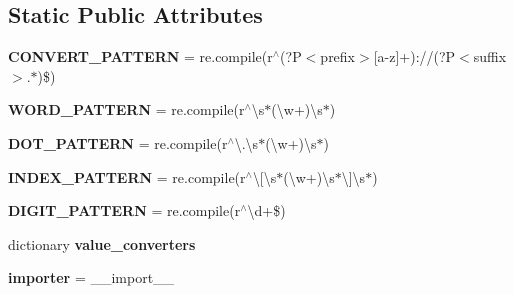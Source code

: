 \subsection*{Static Public Attributes}
\begin{DoxyCompactItemize}
\item 
\mbox{\label{classpip_1_1compat_1_1dictconfig_1_1_base_configurator_a16d71888a0a0416fc67f87da404765a2}} 
{\bfseries C\+O\+N\+V\+E\+R\+T\+\_\+\+P\+A\+T\+T\+E\+RN} = re.\+compile(r\textquotesingle{}$^\wedge$(?P$<$prefix$>$\mbox{[}a-\/z\mbox{]}+)\+://(?P$<$suffix$>$.$\ast$)\$\textquotesingle{})
\item 
\mbox{\label{classpip_1_1compat_1_1dictconfig_1_1_base_configurator_a732ec2589655e26816b061e16e42a866}} 
{\bfseries W\+O\+R\+D\+\_\+\+P\+A\+T\+T\+E\+RN} = re.\+compile(r\textquotesingle{}$^\wedge$\textbackslash{}s$\ast$(\textbackslash{}w+)\textbackslash{}s$\ast$\textquotesingle{})
\item 
\mbox{\label{classpip_1_1compat_1_1dictconfig_1_1_base_configurator_a87c98c71a2e6f32b9d1253503c13fdac}} 
{\bfseries D\+O\+T\+\_\+\+P\+A\+T\+T\+E\+RN} = re.\+compile(r\textquotesingle{}$^\wedge$\textbackslash{}.\textbackslash{}s$\ast$(\textbackslash{}w+)\textbackslash{}s$\ast$\textquotesingle{})
\item 
\mbox{\label{classpip_1_1compat_1_1dictconfig_1_1_base_configurator_afc5b903be033c15bb17242a54a2ee76d}} 
{\bfseries I\+N\+D\+E\+X\+\_\+\+P\+A\+T\+T\+E\+RN} = re.\+compile(r\textquotesingle{}$^\wedge$\textbackslash{}\mbox{[}\textbackslash{}s$\ast$(\textbackslash{}w+)\textbackslash{}s$\ast$\textbackslash{}\mbox{]}\textbackslash{}s$\ast$\textquotesingle{})
\item 
\mbox{\label{classpip_1_1compat_1_1dictconfig_1_1_base_configurator_a70fe137adf4b3b96ae82aab2d160be65}} 
{\bfseries D\+I\+G\+I\+T\+\_\+\+P\+A\+T\+T\+E\+RN} = re.\+compile(r\textquotesingle{}$^\wedge$\textbackslash{}d+\$\textquotesingle{})
\item 
dictionary {\bfseries value\+\_\+converters}
\item 
\mbox{\label{classpip_1_1compat_1_1dictconfig_1_1_base_configurator_a3e15d04d68618601781294fa23f29eca}} 
{\bfseries importer} = \+\_\+\+\_\+import\+\_\+\+\_\+
\end{DoxyCompactItemize}


